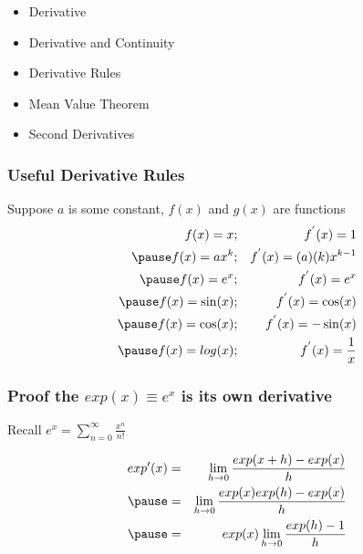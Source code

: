 \documentclass{beamer}
\numberwithin{equation}{section}
\begin{document}
\begin{frame}

\begin{itemize}
\item \textcolor{mygray}{Derivative}
\item \textcolor{mygray}{Derivative and Continuity}
\item \textcolor{myblack}{Derivative Rules}
\item \textcolor{mygray}{Mean Value Theorem}
\item \textcolor{mygray}{Second Derivatives}
\end{itemize}

\end{frame}


\begin{frame}
\frametitle{Useful Derivative Rules}

Suppose $a$ is some constant, $f(x)$ and $g(x)$ are functions \pause 
\begin{eqnarray}
f(x) = x & ; & f^{'}(x) = 1 \nonumber \\ \pause 
f(x) = a x^{k} & ; & f^{'}(x) = (a) (k) x ^{k-1} \nonumber \\ \pause 
f(x) = e^{x } & ; & f^{'} (x) = e^{x} \nonumber \\ \pause 
f(x) = \sin(x) & ; & f^{'} (x) = \cos (x) \nonumber \\ \pause 
f(x) = \cos(x) & ; & f^{'} (x) = - \sin(x) \nonumber \\ \pause 
f(x) = log(x) & ; & f^{'} (x) = \frac{1}{x} \nonumber 
\end{eqnarray}

\end{frame}

\begin{frame}
\frametitle{Proof the $exp(x)\equiv e^x$ is its own derivative}

Recall $e^x=\sum_{n=0}^{\infty} \frac{x^n}{n!}$

\begin{eqnarray}
exp'(x) &=& \lim_{h\rightarrow 0} \frac{exp(x+h)-exp(x)}{h} \nonumber\\\pause
&=& \lim_{h\rightarrow 0} \frac{exp(x)exp(h)-exp(x)}{h}\nonumber\\\pause
&=& exp(x)\lim_{h\rightarrow 0} \frac{exp(h)-1}{h}\nonumber
\end{eqnarray}
\pause

\end{frame}
\end{document}
